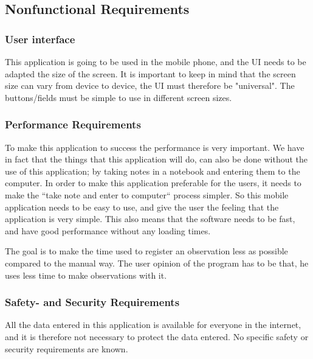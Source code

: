 \subsection{Nonfunctional Requirements}

\subsubsection{User interface}
	This application is going to be used in the mobile phone, and the UI needs to be adapted the size of the screen. It is important to keep in mind that the screen size can vary from device to device, the UI must therefore be "universal". The buttons/fields
must be simple to use in different screen sizes.
\subsubsection{Performance Requirements}
	To make this application to success the performance is very important. We have in fact that the things that this application will do, can also be done without the use of this application; by taking notes in a notebook and entering them to the computer. In order to make this application  preferable for the users, it needs to make the ``take note and enter to computer`` process simpler.  So this mobile application  needs to be easy to use, and give the user the feeling that the application is very simple. This also means that the software needs to be fast, and have good performance without any loading times.

The goal is to make the time used to register an observation less as possible compared to the manual way. The user opinion of the program has to be that, he uses less time to make observations with it. 

\subsubsection{ Safety- and Security Requirements}
	All the data entered in this application  is available for everyone in the internet, and it is therefore not necessary to protect the data entered. No specific safety or security requirements are known.